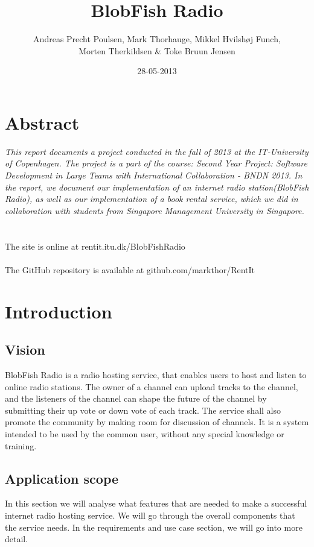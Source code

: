 \documentclass[a4paper,11pt,report]{article}
\begin{document}
\title{BlobFish Radio}
\author{Andreas Precht Poulsen, Mark Thorhauge, Mikkel Hvilsh\o j Funch,\\Morten Therkildsen \& Toke Bruun Jensen}
\date{28-05-2013}
\maketitle
\newpage
\section*{Abstract}
\emph{
This report documents a project conducted in the fall of 2013 at the IT-University of Copenhagen. The project is a part of the course: Second Year Project: Software Development in Large Teams with International Collaboration - BNDN 2013. In the report, we document our implementation of an internet radio station(BlobFish Radio), as well as our implementation of a book rental service, which we did in collaboration with students from Singapore Management University in Singapore.}\\ \\ \\
The site is online at rentit.itu.dk/BlobFishRadio \\ \\
The GitHub repository is available at github.com/markthor/RentIt
\newpage
\tableofcontents
\newpage
\section{Introduction}
\subsection{Vision}
BlobFish Radio is a radio hosting service, that enables users to host and listen to online radio stations. The owner of a channel can upload tracks to the channel, and the listeners of the channel can shape the future of the channel by submitting their up vote or down vote of each track. The service shall also promote the community by making room for discussion of channels.
It is a system intended to be used by the common user, without any special knowledge or training.

\subsection{Application scope}
In this section we will analyse what features that are needed to make a successful internet radio hosting service. We will go through the overall components that the service needs. In the requirements and use case section, we will go into more detail.
\end{document}
